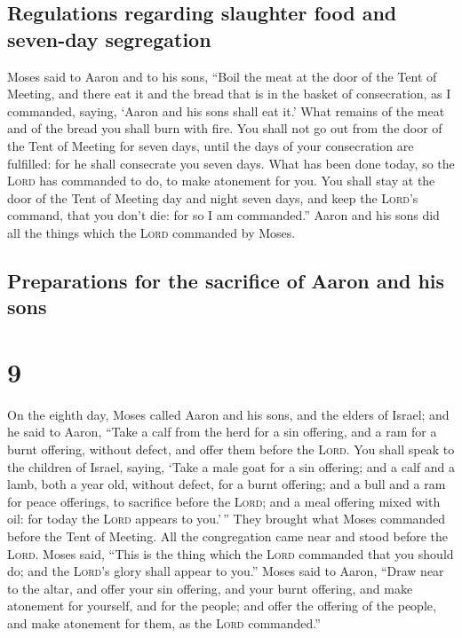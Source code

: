 \hypertarget{regulations-regarding-slaughter-food-and-seven-day-segregation}{%
\subsection{Regulations regarding slaughter food and seven-day
segregation}\label{regulations-regarding-slaughter-food-and-seven-day-segregation}}

 Moses said to Aaron and to his sons, ``Boil the meat at
the door of the Tent of Meeting, and there eat it and the bread that is
in the basket of consecration, as I commanded, saying, `Aaron and his
sons shall eat it.'  What remains of the meat and of the
bread you shall burn with fire.  You shall not go out
from the door of the Tent of Meeting for seven days, until the days of
your consecration are fulfilled: for he shall consecrate you seven days.
 What has been done today, so the \textsc{Lord} has
commanded to do, to make atonement for you.  You shall
stay at the door of the Tent of Meeting day and night seven days, and
keep the \textsc{Lord}'s command, that you don't die: for so I am
commanded.''  Aaron and his sons did all the things which
the \textsc{Lord} commanded by Moses.

\hypertarget{preparations-for-the-sacrifice-of-aaron-and-his-sons}{%
\subsection{Preparations for the sacrifice of Aaron and his
sons}\label{preparations-for-the-sacrifice-of-aaron-and-his-sons}}

\hypertarget{section-8}{%
\section{9}\label{section-8}}

 On the eighth day, Moses called Aaron and his sons, and
the elders of Israel;  and he said to Aaron, ``Take a calf
from the herd for a sin offering, and a ram for a burnt offering,
without defect, and offer them before the \textsc{Lord}. 
You shall speak to the children of Israel, saying, `Take a male goat for
a sin offering; and a calf and a lamb, both a year old, without defect,
for a burnt offering;  and a bull and a ram for peace
offerings, to sacrifice before the \textsc{Lord}; and a meal offering
mixed with oil: for today the \textsc{Lord} appears to you.'\,''
 They brought what Moses commanded before the Tent of
Meeting. All the congregation came near and stood before the
\textsc{Lord}.  Moses said, ``This is the thing which the
\textsc{Lord} commanded that you should do; and the \textsc{Lord}'s
glory shall appear to you.''  Moses said to Aaron, ``Draw
near to the altar, and offer your sin offering, and your burnt offering,
and make atonement for yourself, and for the people; and offer the
offering of the people, and make atonement for them, as the
\textsc{Lord} commanded.''

